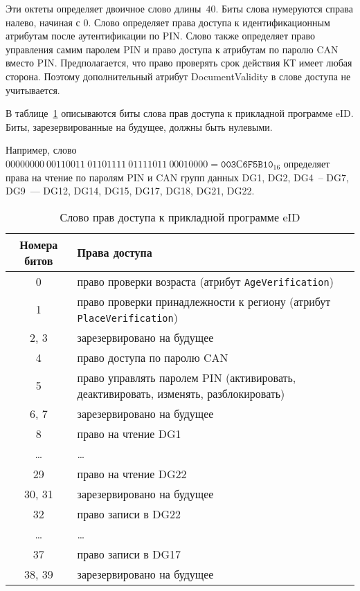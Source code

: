 
Эти октеты определяет двоичное слово длины~$40$.
Биты слова нумеруются справа налево, начиная с 0. 
Слово определяет права доступа к идентификационным атрибутам после 
аутентификации по PIN.  
%
Слово также определяет право управления самим паролем 
PIN и право доступа к атрибутам по паролю CAN вместо PIN. 
%
Предполагается, что право проверять срок действия КТ 
имеет любая сторона. Поэтому дополнительный атрибут DocumentValidity 
в слове доступа не учитывается. 

В таблице~\ref{Table.DATA.Access} описываются биты слова прав 
доступа к прикладной программе eID. Биты, зарезервированные на будущее, 
должны быть нулевыми.

Например, слово 
$00000000\ 00110011\ 01101111\ 01111011\ 00010000 = \texttt{003С6F5B10}_{16}$ 
определяет права на чтение по паролям PIN и CAN групп данных DG1, DG2, 
DG4~-- DG7, DG9~--- DG12, DG14, DG15, DG17, DG18, DG21, DG22.

\begin{table}[h!]
\caption{Слово прав доступа к прикладной программе eID}
\label{Table.DATA.Access}
\begin{tabular}{|c|p{13.5cm}|}
\hline
Номера битов & Права доступа\\
\hline
\hline
0 & право проверки возраста (атрибут \verb|AgeVerification|)\\
\hline 
1  &  право проверки принадлежности к региону (атрибут \verb|PlaceVerification|)\\
\hline 
2, 3 & зарезервировано на будущее\\
\hline 
4 & право доступа по паролю CAN\\
\hline
5 & право управлять паролем PIN
(активировать, деактивировать, изменять, разблокировать)\\
\hline 
6, 7 & зарезервировано на будущее\\
\hline 
8  &  право на чтение DG1\\
\hline 
\dots &	\dots\\
\hline 
29 &  право на чтение DG22\\
\hline
30, 31 & зарезервировано на будущее\\
\hline 
32 & право записи в DG22\\
\hline
\dots &	\dots  \\
\hline
37 & право записи в DG17\\
\hline 
38, 39 & зарезервировано на будущее\\
\hline                                                                
\end{tabular}
\end{table}
                                                                            
